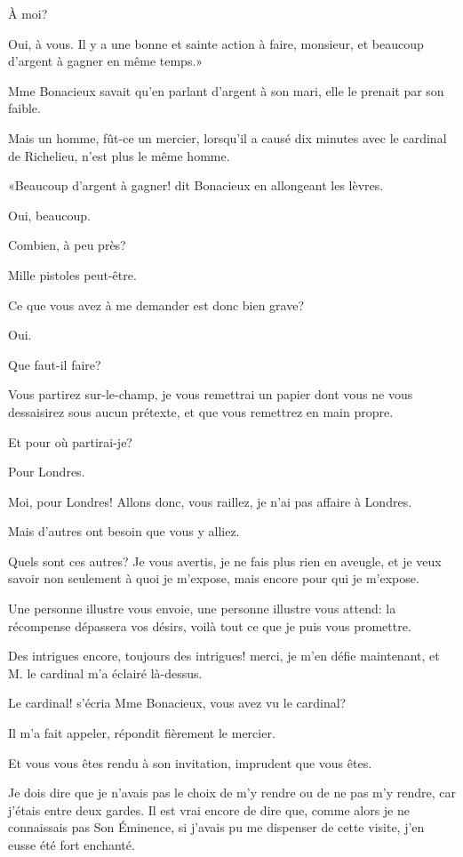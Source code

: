 \speak  À moi? 

\speak  Oui, à vous. Il y a une bonne et sainte action à faire, monsieur, et beaucoup d'argent à gagner en même temps.» 

Mme Bonacieux savait qu'en parlant d'argent à son mari, elle le prenait par son faible. 

Mais un homme, fût-ce un mercier, lorsqu'il a causé dix minutes avec le cardinal de Richelieu, n'est plus le même homme. 

«Beaucoup d'argent à gagner! dit Bonacieux en allongeant les lèvres. 

\speak  Oui, beaucoup. 

\speak  Combien, à peu près? 

\speak  Mille pistoles peut-être. 

\speak  Ce que vous avez à me demander est donc bien grave? 

\speak  Oui. 

\speak  Que faut-il faire? 

\speak  Vous partirez sur-le-champ, je vous remettrai un papier dont vous ne vous dessaisirez sous aucun prétexte, et que vous remettrez en main propre. 

\speak  Et pour où partirai-je? 

\speak  Pour Londres. 

\speak  Moi, pour Londres! Allons donc, vous raillez, je n'ai pas affaire à Londres. 

\speak  Mais d'autres ont besoin que vous y alliez. 

\speak  Quels sont ces autres? Je vous avertis, je ne fais plus rien en aveugle, et je veux savoir non seulement à quoi je m'expose, mais encore pour qui je m'expose. 

\speak  Une personne illustre vous envoie, une personne illustre vous attend: la récompense dépassera vos désirs, voilà tout ce que je puis vous promettre. 

\speak  Des intrigues encore, toujours des intrigues! merci, je m'en défie maintenant, et M. le cardinal m'a éclairé là-dessus. 

\speak  Le cardinal! s'écria Mme Bonacieux, vous avez vu le cardinal? 

\speak  Il m'a fait appeler, répondit fièrement le mercier. 

\speak  Et vous vous êtes rendu à son invitation, imprudent que vous êtes. 

\speak  Je dois dire que je n'avais pas le choix de m'y rendre ou de ne pas m'y rendre, car j'étais entre deux gardes. Il est vrai encore de dire que, comme alors je ne connaissais pas Son Éminence, si j'avais pu me dispenser de cette visite, j'en eusse été fort enchanté. 

